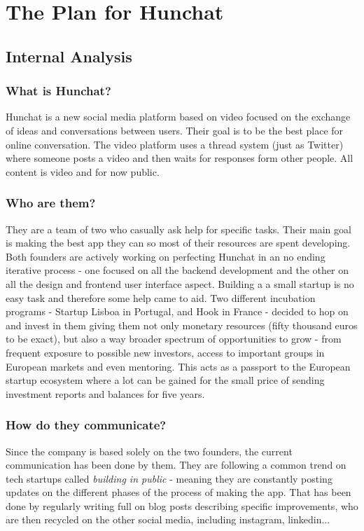 \documentclass[12pt]{article}
\begin{document}
\section{The Plan for Hunchat}\label{plan}



\subsection{Internal Analysis}

	\subsubsection{What is Hunchat?}
Hunchat is a new social media platform based on video focused on the exchange of ideas and conversations between users. Their goal is to be the best place for online conversation. The video platform uses a thread system (just as Twitter) where someone posts a video and then waits for responses form other people. All content is video and for now public.

	\subsubsection{Who are them?}
They are a team of two who casually ask help for specific tasks. Their main goal is making the best app they can so most of their resources are spent developing. Both founders are actively working on perfecting Hunchat in an no ending iterative process - one focused on all the backend development and the other on all the design and frontend user interface aspect. Building a a small startup is no easy task and therefore some help came to aid. Two different incubation programs - Startup Lisboa in Portugal, and Hook in France - decided to hop on and invest in them giving them not only monetary resources (fifty thousand euros to be exact), but also a way broader spectrum of opportunities to grow - from frequent exposure to possible new investors, access to important groups in European markets and even mentoring. This acts as a passport to the European startup ecosystem where a lot can be gained for the small price of sending investment reports and balances for five years.

	\subsubsection{How do they communicate?}
Since the company is based solely on the two founders, the current communication has been done by them. They are following a common trend on tech startups called \textit{building in public} - meaning they are constantly posting updates on the different phases of the process of making the app. That has been done by regularly writing full on blog posts describing specific improvements, who are then recycled on the other social media, including instagram, linkedin...
\end{document}
